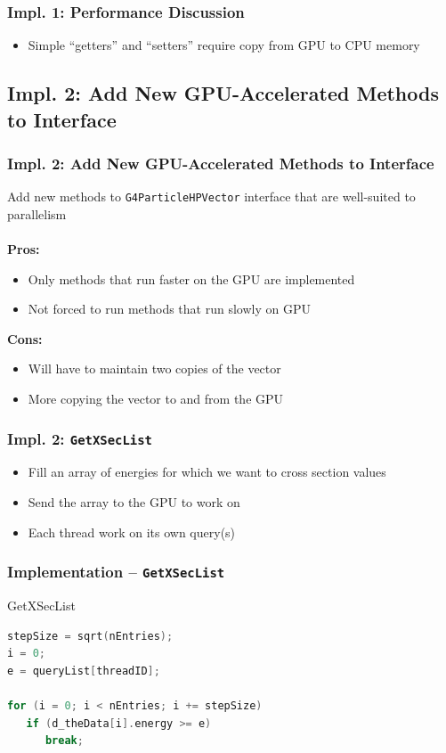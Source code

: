 \documentclass{beamer}
\newcommand\pro{\item[$+$]}
\newcommand\con{\item[$-$]}
\begin{document}
\begin{frame}
\frametitle{Impl. 1: Performance Discussion}
\begin{itemize}
\item Simple ``getters'' and ``setters'' require copy from GPU to CPU memory
\end{itemize}
\end{frame}

\subsection{Impl. 2: Add New GPU-Accelerated Methods to Interface}
\begin{frame}
\frametitle{Impl. 2: Add New GPU-Accelerated Methods to Interface}
Add new methods to \texttt{G4ParticleHPVector} interface that are well-suited to parallelism\\~\\

\textbf{Pros:}
\begin{itemize}
\pro Only methods that run faster on the GPU are implemented
\pro Not forced to run methods that run slowly on GPU
\end{itemize}

\textbf{Cons:}
\begin{itemize}
\con Will have to maintain two copies of the vector
\con More copying the vector to and from the GPU
\end{itemize}
\end{frame}

\begin{frame}
\frametitle{Impl. 2: \texttt{GetXSecList}}
\begin{itemize}
\item Fill an array of energies for which we want to cross section values
\item Send the array to the GPU to work on
\item Each thread work on its own query(s)
\end{itemize}
\end{frame}

\begin{frame}[fragile]
\frametitle{Implementation -- \texttt{GetXSecList}}
\begin{block}{GetXSecList}
\begin{lstlisting}[language=C++,basicstyle=\ttfamily,keywordstyle=\color{red}]
stepSize = sqrt(nEntries);
i = 0;
e = queryList[threadID];
    
for (i = 0; i < nEntries; i += stepSize) 
   if (d_theData[i].energy >= e) 
      break;
\end{lstlisting}
\end{block}
\end{frame}
\end{document}
